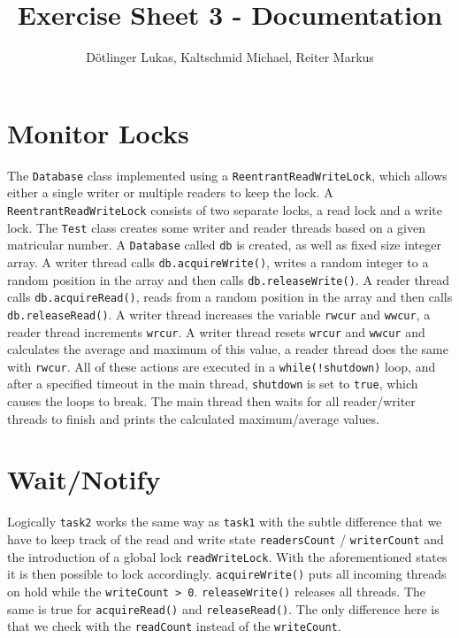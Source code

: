 \documentclass{article}
\begin{document}
	\title{Exercise Sheet 3 - Documentation}
	\date{}
	\author{Dötlinger Lukas, Kaltschmid Michael, Reiter Markus}

	\maketitle

  \section{Monitor Locks}

    The \texttt{Database} class implemented using a \texttt{ReentrantReadWriteLock}, which allows either a single writer or multiple readers to keep the lock. A \texttt{ReentrantReadWriteLock} consists of two separate locks, a read lock and a write lock.
    The \texttt{Test} class creates some writer and reader threads based on a given matricular number. A \texttt{Database} called \texttt{db} is created, as well as fixed size integer array.
    A writer thread calls \texttt{db.acquireWrite()}, writes a random integer to a random position in the array and then calls \texttt{db.releaseWrite()}.
    A reader thread calls \texttt{db.acquireRead()}, reads from a random position in the array and then calls \texttt{db.releaseRead()}.
    A writer thread increases the variable \texttt{rwcur} and \texttt{wwcur}, a reader thread increments \texttt{wrcur}.
    A writer thread resets \texttt{wrcur} and \texttt{wwcur} and calculates the average and maximum of this value, a reader thread does the same with \texttt{rwcur}.
    All of these actions are executed in a \texttt{while(!shutdown)} loop, and after a specified timeout in the main thread, \texttt{shutdown} is set to \texttt{true}, which causes the loops to break. The main thread then waits for all reader/writer threads to finish and prints the calculated maximum/average values.

  \section{Wait/Notify}
    Logically \texttt{task2} works the same way as \texttt{task1} with the subtle difference that we have to keep track of the read and write state \texttt{readersCount} / \texttt{writerCount} and the introduction of a global lock \texttt{readWriteLock}. With the aforementioned states it is then possible to lock accordingly. \texttt{acquireWrite()} puts all incoming threads on hold while the \texttt{writeCount > 0}. \texttt{releaseWrite()} releases all threads. The same is true for \texttt{acquireRead()} and \texttt{releaseRead()}. The only difference here is that we check with the \texttt{readCount} instead of the \texttt{writeCount}.
\end{document}
